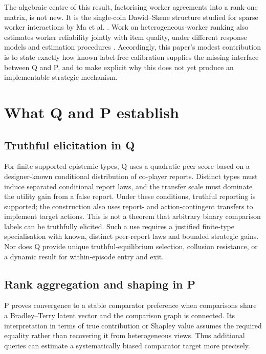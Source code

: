 \documentclass{article}
\begin{document}
The algebraic centre of this result, factorising worker agreements into a rank-one matrix, is not new.  It is the single-coin Dawid--Skene structure studied for sparse worker interactions by Ma et al. \cite{ma2017crowdsourcing,ma2019gradient}.  Work on heterogeneous-worker ranking also estimates worker reliability jointly with item quality, under different response models and estimation procedures \cite{nordio2023quite,shejole2026signal}.  Accordingly, this paper's modest contribution is to state exactly how known label-free calibration supplies the missing interface between Q and P, and to make explicit why this does not yet produce an implementable strategic mechanism. %

\section{What Q and P establish}

\subsection{Truthful elicitation in Q}

For finite supported epistemic types, Q uses a quadratic peer score based on a designer-known conditional distribution of co-player reports.  Distinct types must induce separated conditional report laws, and the transfer scale must dominate the utility gain from a false report.  Under these conditions, truthful reporting is supported; the construction also uses report- and action-contingent transfers to implement target actions. %
This is not a theorem that arbitrary binary comparison labels can be truthfully elicited.  Such a use requires a justified finite-type specialisation with known, distinct peer-report laws and bounded strategic gains. %
Nor does Q provide unique truthful-equilibrium selection, collusion resistance, or a dynamic result for within-episode entry and exit. %

\subsection{Rank aggregation and shaping in P}

P proves convergence to a stable comparator preference when comparisons share a Bradley--Terry latent vector and the comparison graph is connected.  Its interpretation in terms of true contribution or Shapley value assumes the required equality rather than recovering it from heterogeneous views. %
Thus additional queries can estimate a systematically biased comparator target more precisely. %
\end{document}
